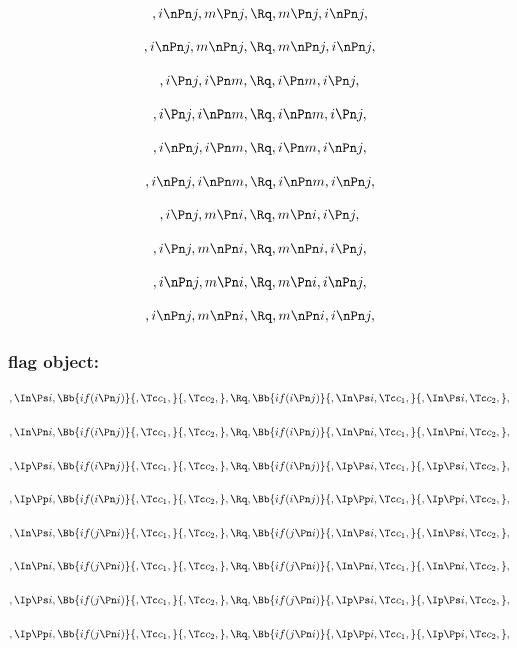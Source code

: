 \[,i \nPn j, m \Pn j, \Rq , m \Pn j, i \nPn j,\]

\[,i \nPn j, m \nPn j, \Rq , m \nPn j, i \nPn j,\]

\bigskip
\bigskip


\[,i \Pn j, i \Pn m, \Rq , i \Pn m, i \Pn j,\]

\[,i \Pn j, i \nPn m, \Rq , i \nPn m, i \Pn j,\]

\[,i \nPn j, i \Pn m, \Rq , i \Pn m, i \nPn j,\]

\[,i \nPn j, i \nPn m, \Rq , i \nPn m, i \nPn j,\]


\bigskip
\bigskip

\[,i \Pn j, m \Pn i, \Rq , m \Pn i, i \Pn j,\]

\[,i \Pn j, m \nPn i, \Rq , m \nPn i, i \Pn j,\]

\[,i \nPn j, m \Pn i, \Rq , m \Pn i, i \nPn j,\]

\[,i \nPn j, m \nPn i, \Rq , m \nPn i, i \nPn j,\]




\bigskip
\bigskip
\bigskip
\bigskip
\subsubsection{flag object:} 
\bigskip
\bigskip
\[,\In \Ps i, \Bb{if(i \Pn j)}{,\Tc c_1,}{,\Tc c_2,}, \Rq ,\Bb{if(i \Pn j)}{,\In \Ps i, \Tc c_1,}{,\In \Ps i, \Tc c_2,},\]

\bigskip
\bigskip
\[, \In \Pn i, \Bb{if(i \Pn j)}{,\Tc c_1,}{,\Tc c_2,}, \Rq ,\Bb{if(i \Pn j)}{,\In \Pn i, \Tc c_1,}{,\In \Pn i, \Tc c_2,},\]

\bigskip
\bigskip
\[,\Ip \Ps i, \Bb{if(i \Pn j)}{,\Tc c_1,}{,\Tc c_2,}, \Rq ,\Bb{if(i \Pn j)}{,\Ip \Ps i, \Tc c_1,}{,\Ip \Ps i, \Tc c_2,},\]

\bigskip
\bigskip
\[,\Ip \Pp i, \Bb{if(i \Pn j)}{,\Tc c_1,}{,\Tc c_2,}, \Rq ,\Bb{if(i \Pn j)}{,\Ip \Pp i, \Tc c_1,}{,\Ip \Pp i, \Tc c_2,},\]

\bigskip
\bigskip
\[,\In \Ps i, \Bb{if(j \Pn i)}{,\Tc c_1,}{,\Tc c_2,}, \Rq ,\Bb{if(j \Pn i)}{,\In \Ps i, \Tc c_1,}{,\In \Ps i, \Tc c_2,},\]

\bigskip
\bigskip
\[, \In \Pn i, \Bb{if(j \Pn i)}{,\Tc c_1,}{,\Tc c_2,}, \Rq ,\Bb{if(j \Pn i)}{,\In \Pn i, \Tc c_1,}{,\In \Pn i, \Tc c_2,},\]

\bigskip
\bigskip
\[,\Ip \Ps i, \Bb{if(j \Pn i)}{,\Tc c_1,}{,\Tc c_2,}, \Rq ,\Bb{if(j \Pn i)}{,\Ip \Ps i, \Tc c_1,}{,\Ip \Ps i, \Tc c_2,},\]

\bigskip
\bigskip
\[,\Ip \Pp i, \Bb{if(j \Pn i)}{,\Tc c_1,}{,\Tc c_2,}, \Rq ,\Bb{if(j \Pn i)}{,\Ip \Pp i, \Tc c_1,}{,\Ip \Pp i, \Tc c_2,},\]


